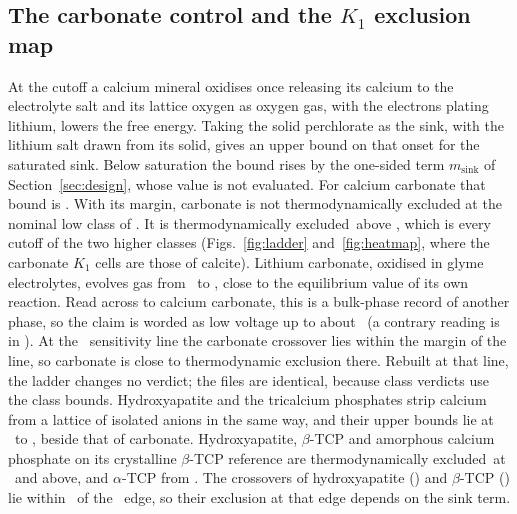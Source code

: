 \subsection{The carbonate control and the $K_1$ exclusion map}\label{sec:res-carbonate}
At the cutoff a calcium mineral oxidises once releasing its calcium to the electrolyte salt and its lattice oxygen as oxygen gas, with the electrons plating lithium, lowers the free energy. %
Taking the solid perchlorate as the sink, with the lithium salt drawn from its solid, gives an upper bound on that onset for the saturated sink\nacreSinkMark. %
Below saturation the bound rises by the one-sided term $m_\mathrm{sink}$ of Section~\ref{sec:design}, whose value is not evaluated. %
For calcium carbonate that bound is \NumCarbonateOnset. %
With its margin, carbonate is not thermodynamically excluded at the nominal low class of \NumClassLo. %
It is thermodynamically excluded\nacreExcludedMark\nacreSinkMark\ above \NumCarbonateCrossover, which is every cutoff of the two higher classes (Figs.~\ref{fig:ladder} and~\ref{fig:heatmap}, where the carbonate $K_1$ cells are those of calcite). %
Lithium carbonate, oxidised in glyme electrolytes, evolves gas from \NumTierTwoLow\ to \NumTierTwoHigh, close to the equilibrium value of its own reaction\cite{mahne2018electrochemical,cao2022oxidative}. %
Read across to calcium carbonate, this is a bulk-phase record of another phase, so the claim is worded as low voltage up to about \NumTierTwoLow\ (a contrary reading is in ). %
At the \NumClassSensitivity\ sensitivity line the carbonate crossover lies within the margin of the line, so carbonate is close to thermodynamic exclusion there. %
Rebuilt at that line, the ladder changes no verdict; the files are identical, because class verdicts use the class bounds. %
Hydroxyapatite and the tricalcium phosphates strip calcium from a lattice of isolated anions in the same way, and their upper bounds lie at \NumOnsetBoneLow\ to \NumOnsetBoneHigh, beside that of carbonate. %
Hydroxyapatite, $\beta$-TCP and amorphous calcium phosphate on its crystalline $\beta$-TCP reference are thermodynamically excluded\nacreExcludedMark\nacreSinkMark\ at \NumClassMidHigh\ and above, and $\alpha$-TCP from \NumClassMidLow. %
The crossovers of hydroxyapatite (\NumHapCrossover) and $\beta$-TCP (\NumBtcpCrossover) lie within \NumEdgeTolerance\ of the \NumClassMidLow\ edge, so their exclusion at that edge depends on the sink term. %
